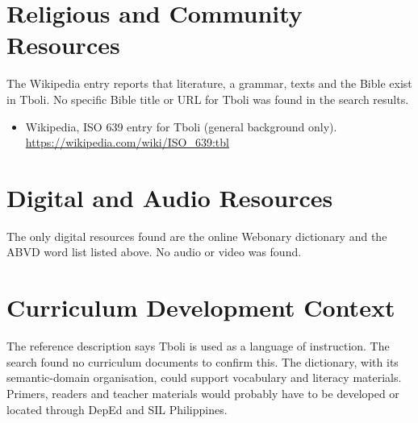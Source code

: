 \documentclass[12pt]{article}
\begin{document}
\section{Religious and Community Resources}
The Wikipedia entry reports that literature, a grammar, texts and the Bible exist in Tboli. No specific Bible title or URL for Tboli was found in the search results.
\begin{itemize}
\item Wikipedia, ISO 639 entry for Tboli (general background only). \url{https://wikipedia.com/wiki/ISO_639:tbl}
\end{itemize}

\section{Digital and Audio Resources}
The only digital resources found are the online Webonary dictionary and the ABVD word list listed above. No audio or video was found.

\section{Curriculum Development Context}
The reference description says Tboli is used as a language of instruction. The search found no curriculum documents to confirm this. The dictionary, with its semantic-domain organisation, could support vocabulary and literacy materials. Primers, readers and teacher materials would probably have to be developed or located through DepEd and SIL Philippines.
\end{document}
